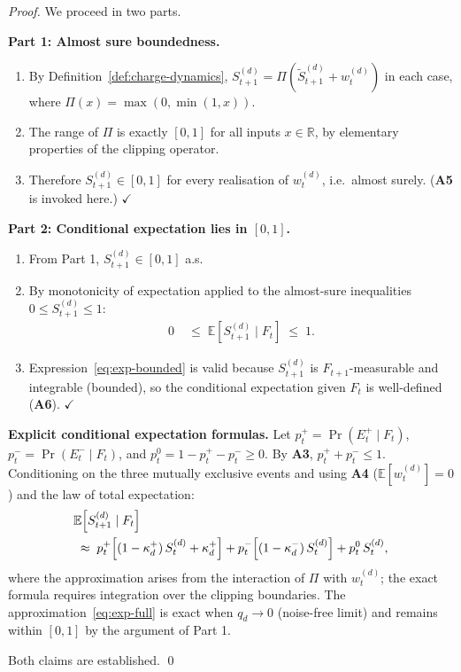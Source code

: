 \documentclass[12pt,openany]{book}
\numberwithin{equation}{chapter}
\theoremstyle{plain}
\theoremstyle{definition}
\theoremstyle{remark}
\def\mathcal#1{#1}%
\begin{document}
\begin{proof}
We proceed in two parts.

\medskip
\noindent\textbf{Part 1: Almost sure boundedness.}
\begin{enumerate}
  \item By Definition~\ref{def:charge-dynamics},
    $\mathcal{S}_{t+1}^{(d)} = \Pi(\tilde{\mathcal{S}}_{t+1}^{(d)}
    + w_t^{(d)})$ in each case, where $\Pi(x)
    = \max(0,\min(1,x))$.
  \item The range of $\Pi$ is exactly $[0,1]$ for all inputs
    $x \in \mathbb{R}$, by elementary properties of the clipping
    operator.
  \item Therefore $\mathcal{S}_{t+1}^{(d)} \in [0,1]$ for every
    realisation of $w_t^{(d)}$, i.e.\ almost surely.
    (\textbf{A5} is invoked here.) $\checkmark$
\end{enumerate}

\medskip
\noindent\textbf{Part 2: Conditional expectation lies in $[0,1]$.}
\begin{enumerate}
  \item From Part 1, $\mathcal{S}_{t+1}^{(d)} \in [0,1]$ a.s.
  \item By monotonicity of expectation applied to the almost-sure
    inequalities $0 \leq \mathcal{S}_{t+1}^{(d)} \leq 1$:
    \begin{align}
      0
        &\;\leq\; \mathbb{E}\!\left[
            \mathcal{S}_{t+1}^{(d)} \mid \mathcal{F}_t
          \right]
         \;\leq\; 1.
      \label{eq:exp-bounded}
    \end{align}
  \item Expression~\eqref{eq:exp-bounded} is valid because
    $\mathcal{S}_{t+1}^{(d)}$ is $\mathcal{F}_{t+1}$-measurable
    and integrable (bounded), so the conditional expectation
    given $\mathcal{F}_t$ is well-defined (\textbf{A6}).
    $\checkmark$
\end{enumerate}

\medskip
\noindent\textbf{Explicit conditional expectation formulas.}
Let $p_t^{+} = \Pr(E_t^{+} \mid \mathcal{F}_t)$,
$p_t^{-} = \Pr(E_t^{-} \mid \mathcal{F}_t)$, and
$p_t^{0} = 1 - p_t^{+} - p_t^{-} \geq 0$.
By \textbf{A3}, $p_t^{+} + p_t^{-} \leq 1$.
Conditioning on the three mutually exclusive events and using
\textbf{A4} ($\mathbb{E}[w_t^{(d)}] = 0$) and the law of total
expectation:
\begin{align}
  &\mathbb{E}\!\left[
      \mathcal{S}_{t+1}^{(d)} \mid \mathcal{F}_t
    \right]
  \notag \\
  &\;\approx\;
    p_t^{+}\!\left[
      (1-\kappa_d^{+})\,\mathcal{S}_t^{(d)} + \kappa_d^{+}
    \right]
  + p_t^{-}\!\left[
      (1-\kappa_d^{-})\,\mathcal{S}_t^{(d)}
    \right]
  + p_t^{0}\,\mathcal{S}_t^{(d)},
  \label{eq:exp-full}
\end{align}
where the approximation arises from the interaction of $\Pi$ with
$w_t^{(d)}$; the exact formula requires integration over the
clipping boundaries.  The approximation~\eqref{eq:exp-full} is
exact when $q_d \to 0$ (noise-free limit) and remains within
$[0,1]$ by the argument of Part 1.

\medskip
\noindent Both claims are established. \qed
\end{proof}
\end{document}
